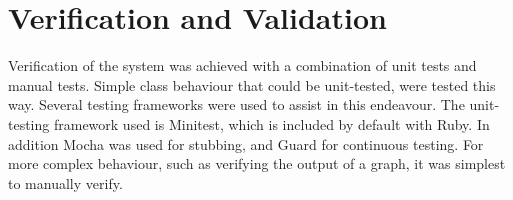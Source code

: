 \chapter{Verification and Validation}
\label{chap:verification}

Verification of the system was achieved with a combination of unit tests and manual tests. Simple class behaviour that could be unit-tested, were tested this way. Several testing frameworks were used to assist in this endeavour. The unit-testing framework used is Minitest, which is included by default with Ruby. In addition Mocha was used for stubbing, and Guard for continuous testing. For more complex behaviour, such as verifying the output of a graph, it was simplest to manually verify.


